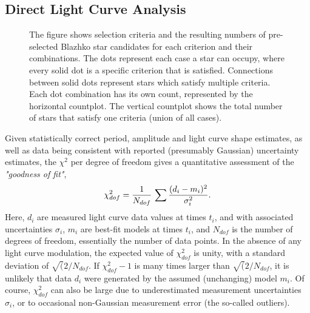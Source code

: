  
\subsection{Direct Light Curve Analysis}

\begin{figure}[ht]
    \centering
    \vskip -0.1in
    \caption{The figure shows selection criteria and the resulting numbers of pre-selected Blazhko star candidates for each
      criterion and their combinations. The dots represent each case a star can occupy, where every solid dot is a specific
      criterion that is satisfied. Connections between solid dots represent stars which satisfy multiple criteria. Each dot
      combination has its own count, represented by the horizontal countplot. The vertical countplot shows the total number
      of stars that satisfy one criteria (union of all cases).}
      \label{fig:selstats}
    \end{figure}
    
Given statistically correct period, amplitude and light curve shape estimates,
as well as data being consistent with reported (presumably Gaussian) uncertainty estimates, the $\chi^2$ per degree
of freedom gives a quantitative assessment of the \textit{"goodness of fit"},
\begin{equation}
        \chi_{dof}^2 = {1 \over N_{dof}} \, \sum{\frac{(d_i - m_i)^2}{\sigma_i^2}}.
\end{equation}
Here, $d_i$ are measured light curve data values at times $t_i$, and with associated uncertainties $\sigma_i$,
$m_i$ are best-fit models at times $t_i$, and $N_{dof}$ is the number of degrees of freedom, essentially the
number of data points. In the absence of any light curve modulation, the expected value of $\chi^2_{dof}$ is
unity, with a standard deviation of $\sqrt(2/N_{dof}$.  If $\chi^2_{dof} - 1$ is many times  larger than 
$\sqrt(2/N_{dof}$, it is unlikely that data $d_i$ were generated by the assumed (unchanging) model $m_i$.  
Of course, $\chi^2_{dof}$ can also be large due to underestimated measurement uncertainties $\sigma_i$,
or to occasional non-Gaussian measurement error (the so-called outliers). 

